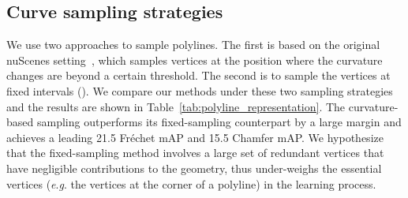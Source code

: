 \documentclass{article}
\newcommand{\ra}[1]{\renewcommand{\arraystretch}{#1}}
\newcommand{\eg}{\textit{e}.\textit{g}. }
\theoremstyle{plain}
\theoremstyle{definition}
\theoremstyle{remark}
\begin{document}
\subsection{Curve sampling strategies}
\begin{table}[h] \centering
    \ra{1.3}
    \caption{ 
        Ablation study of curves sampling strategies.
    }
\label{tab:polyline_representation}
\end{table} We use two approaches to sample polylines. The first is based on the original nuScenes setting~\citep{caesar2020nuscenes}, which samples vertices at the position where the curvature changes are beyond a certain threshold. The second is to sample the vertices at fixed intervals (). We compare our methods under these two sampling strategies and the results are shown in Table~\ref{tab:polyline_representation}.
The curvature-based sampling outperforms its fixed-sampling counterpart by a large margin and achieves a leading 21.5 Fr\'echet mAP and 15.5 Chamfer mAP. We hypothesize that the fixed-sampling method involves a large set of redundant vertices that have negligible contributions to the geometry, thus under-weighs the essential vertices (\eg the vertices at the corner of a polyline) in the learning process.
\end{document}

